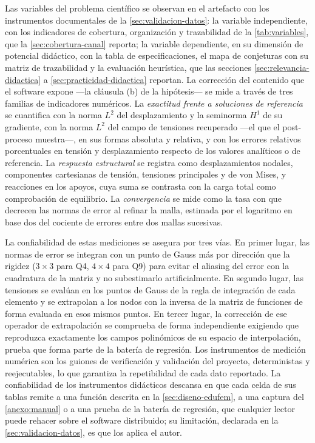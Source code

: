 Las variables del problema científico se observan en el artefacto con los instrumentos documentales de la \autoref{sec:validacion-datos}: la variable independiente, con los indicadores de cobertura, organización y trazabilidad de la \autoref{tab:variables}, que la \autoref{sec:cobertura-canal} reporta; la variable dependiente, en su dimensión de potencial didáctico, con la tabla de especificaciones, el mapa de conjeturas con su matriz de trazabilidad y la evaluación heurística, que las secciones \ref{sec:relevancia-didactica} a \ref{sec:practicidad-didactica} reportan. La corrección del contenido que el software expone —la cláusula (b) de la hipótesis— se mide a través de tres familias de indicadores numéricos. La \emph{exactitud frente a soluciones de referencia} se cuantifica con la norma $L^2$ del desplazamiento y la seminorma $H^1$ de su gradiente, con la norma $L^2$ del campo de tensiones recuperado —el que el post-proceso muestra—, en sus formas absoluta y relativa, y con los errores relativos porcentuales en tensión y desplazamiento respecto de los valores analíticos o de referencia. La \emph{respuesta estructural} se registra como desplazamientos nodales, componentes cartesianas de tensión, tensiones principales y de von Mises, y reacciones en los apoyos, cuya suma se contrasta con la carga total como comprobación de equilibrio. La \emph{convergencia} se mide como la tasa con que decrecen las normas de error al refinar la malla, estimada por el logaritmo en base dos del cociente de errores entre dos mallas sucesivas.

La confiabilidad de estas mediciones se asegura por tres vías. En primer lugar, las normas de error se integran con un punto de Gauss más por dirección que la rigidez ($3\times3$ para Q4, $4\times4$ para Q9) para evitar el aliasing del error con la cuadratura de la matriz y no subestimarlo artificialmente. En segundo lugar, las tensiones se evalúan en los puntos de Gauss de la regla de integración de cada elemento y se extrapolan a los nodos con la inversa de la matriz de funciones de forma evaluada en esos mismos puntos. En tercer lugar, la corrección de ese operador de extrapolación se comprueba de forma independiente exigiendo que reproduzca exactamente los campos polinómicos de su espacio de interpolación, prueba que forma parte de la batería de regresión. Los instrumentos de medición numérica son los guiones de verificación y validación del proyecto, deterministas y reejecutables, lo que garantiza la repetibilidad de cada dato reportado. La confiabilidad de los instrumentos didácticos descansa en que cada celda de sus tablas remite a una función descrita en la \autoref{sec:diseno-edufem}, a una captura del \autoref{anexo:manual} o a una prueba de la batería de regresión, que cualquier lector puede rehacer sobre el software distribuido; su limitación, declarada en la \autoref{sec:validacion-datos}, es que los aplica el autor.

